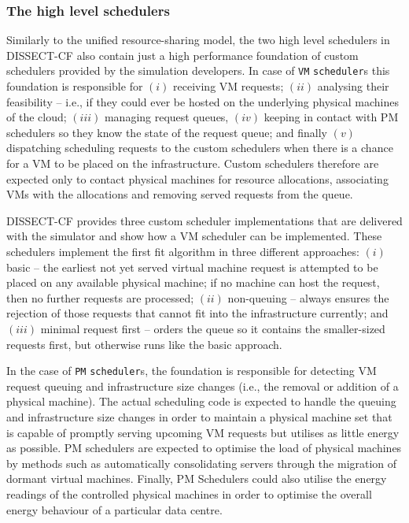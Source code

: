 \documentclass[sort, compress, 5p]{elsarticle}
\begin{document}
\subsubsection{The high level schedulers} \label{Sec-HLS}

Similarly to the unified resource-sharing model, the two high level schedulers in DISSECT-CF also contain just a high performance foundation of custom schedulers provided by the simulation developers. In case of \verb+VM+ \verb+scheduler+s this foundation is responsible for $(i)$ receiving VM requests; $(ii)$ analysing their feasibility -- i.e., if they could ever be hosted on the underlying physical machines of the cloud; $(iii)$ managing request queues, $(iv)$ keeping in contact with PM schedulers so they know the state of the request queue; and finally $(v)$ dispatching scheduling requests to the custom schedulers when there is a chance for a VM to be placed on the infrastructure. Custom schedulers therefore are expected only to contact physical machines for resource allocations, associating VMs with the allocations and removing served requests from the queue.

DISSECT-CF provides three custom scheduler implementations that are delivered with the simulator and show how a VM scheduler can be implemented. These schedulers implement the first fit algorithm in three different approaches: $(i)$ basic -- the earliest not yet served virtual machine request is attempted to be placed on any available physical machine; if no machine can host the request, then no further requests are processed; $(ii)$ non-queuing  -- always ensures the rejection of those requests that cannot fit into the infrastructure currently; and $(iii)$ minimal request first -- orders the queue so it contains the smaller-sized requests first, but otherwise runs like the basic approach.

In the case of \verb+PM+ \verb+scheduler+s, the foundation is responsible for detecting VM request queuing and infrastructure size changes (i.e., the removal or addition of a physical machine). The actual scheduling code is expected to handle the queuing and infrastructure size changes in order to maintain a physical machine set that is capable of promptly serving upcoming VM requests but utilises as little energy as possible. PM schedulers are expected to optimise the load of physical machines by methods such as automatically consolidating servers through the migration of dormant virtual machines. Finally, PM Schedulers could also utilise the energy readings of the controlled physical machines in order to optimise the overall energy behaviour of a particular data centre.
\end{document}
